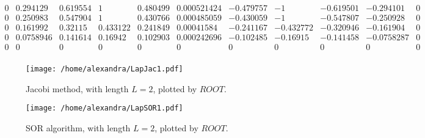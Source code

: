 \documentclass{article}
\begin{document}
\[\begin{array}{ccccccccccc}
\scriptstyle 0  &  \scriptstyle 0.294129  &  \scriptstyle 0.619554  &  \scriptstyle 1  &  \scriptstyle 0.480499  &  \scriptstyle 0.000521424  &  \scriptstyle -0.479757  &  \scriptstyle -1  &  \scriptstyle -0.619501  &  \scriptstyle -0.294101  &  \scriptstyle 0    \\
\scriptstyle 0  &  \scriptstyle 0.250983  &  \scriptstyle 0.547904  &  \scriptstyle 1  &  \scriptstyle 0.430766  &  \scriptstyle 0.000485059  &  \scriptstyle -0.430059  &  \scriptstyle -1  &  \scriptstyle -0.547807  &  \scriptstyle -0.250928  &  \scriptstyle 0    \\
\scriptstyle 0  &  \scriptstyle 0.161992  &  \scriptstyle 0.32115  &  \scriptstyle 0.433122  &  \scriptstyle 0.241849  &  \scriptstyle 0.00041584  &  \scriptstyle -0.241167  &  \scriptstyle -0.432772  &  \scriptstyle -0.320946  &  \scriptstyle -0.161904  &  \scriptstyle 0    \\
\scriptstyle 0  &  \scriptstyle 0.0758946  &  \scriptstyle 0.141614  &  \scriptstyle 0.16942  &  \scriptstyle 0.102903  &  \scriptstyle 0.000242696  &  \scriptstyle -0.102485  &  \scriptstyle -0.16915  &  \scriptstyle -0.141458  &  \scriptstyle -0.0758287  &  \scriptstyle 0    \\
\scriptstyle 0  &  \scriptstyle 0  &  \scriptstyle 0  &  \scriptstyle 0  &  \scriptstyle 0  &  \scriptstyle 0  &  \scriptstyle 0  &  \scriptstyle 0  &  \scriptstyle 0  &  \scriptstyle 0  &  \scriptstyle 0    \\
\end{array}
\]

\begin{figure}[htp]
\centering
\texttt{[image: /home/alexandra/LapJac1.pdf]}
\caption{\sf  \footnotesize Jacobi method, with length $L=2$, plotted by $ROOT$.}
\centering
\texttt{[image: /home/alexandra/LapSOR1.pdf]}
\caption{\sf \footnotesize SOR algorithm, with length $L=2$, plotted by $ROOT$.}
\label{fig1}
\end{figure}

\newpage
\end{document}
